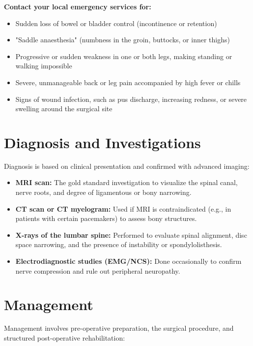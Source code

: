 \textbf{Contact your local emergency services for:}
\begin{itemize}
    \item Sudden loss of bowel or bladder control (incontinence or retention)
    \item "Saddle anaesthesia" (numbness in the groin, buttocks, or inner thighs)
    \item Progressive or sudden weakness in one or both legs, making standing or walking impossible
    \item Severe, unmanageable back or leg pain accompanied by high fever or chills
    \item Signs of wound infection, such as pus discharge, increasing redness, or severe swelling around the surgical site
\end{itemize}

\section*{Diagnosis and Investigations}
Diagnosis is based on clinical presentation and confirmed with advanced imaging:

\begin{itemize}
    \item \textbf{MRI scan:} The gold standard investigation to visualize the spinal canal, nerve roots, and degree of ligamentous or bony narrowing.
    \item \textbf{CT scan or CT myelogram:} Used if MRI is contraindicated (e.g., in patients with certain pacemakers) to assess bony structures.
    \item \textbf{X-rays of the lumbar spine:} Performed to evaluate spinal alignment, disc space narrowing, and the presence of instability or spondylolisthesis.
    \item \textbf{Electrodiagnostic studies (EMG/NCS):} Done occasionally to confirm nerve compression and rule out peripheral neuropathy.
\end{itemize}

\section*{Management}
Management involves pre-operative preparation, the surgical procedure, and structured post-operative rehabilitation:

